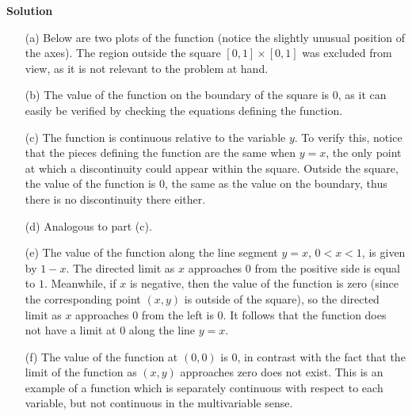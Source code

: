 \documentclass[12pt,oneside]{exam}
\newenvironment{newsolution}{\vspace{.1in}\noindent\textbf{Solution \hspace{.05em}}}{}
\begin{document}
\begin{newsolution}
\begin{itemize}
\item[(a)] Below are two plots of the function (notice the slightly unusual position of the axes). The region outside the square $[0,1] \times [0,1]$ was excluded from view, as it is not relevant to the problem at hand. 

\begin{figure}
\hfill
{}
\hfill
{}
\hfill
\end{figure}

\item[(b)] The value of the function on the boundary of the square is $0$, as it can easily be verified by checking the equations defining the function.  
\item[(c)] The function is continuous relative to the variable $y$. To verify this, notice that the pieces defining the function are the same when $y=x$, the only point at which a discontinuity could appear within the square. Outside the square, the value of the function is $0$, the same as the value on the boundary, thus there is no discontinuity there either. 
\item[(d)] Analogous to part (c). 
\item[(e)] The value of the function along the line segment $y=x$, $0< x< 1$, is given by $1-x$. The directed limit as $x$ approaches $0$ from the positive side is equal to $1$. Meanwhile, if $x$ is negative, then the value of the function is zero (since the corresponding point $(x,y)$ is outside of the square), so the  directed limit as $x$ approaches $0$ from the left is $0$. It follows that the function does not have a limit at $0$ along the line $y=x$. 
\item[(f)] The value of the function at $(0,0)$ is $0$, in contrast with the fact that the limit of the function as $(x,y)$ approaches zero does not exist. This is an example of a function which is separately continuous with respect to each variable, but not continuous in the multivariable sense. 
\end{itemize}

\end{newsolution}
\end{document}
